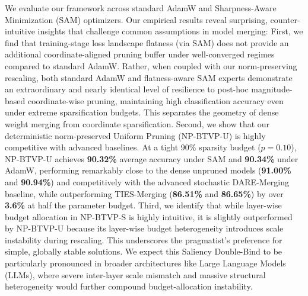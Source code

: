 We evaluate our framework across standard AdamW and Sharpness-Aware Minimization (SAM) \cite{foret2021sharpness} optimizers. Our empirical results reveal surprising, counter-intuitive insights that challenge common assumptions in model merging:
First, we find that training-stage loss landscape flatness (via SAM) does not provide an additional coordinate-aligned pruning buffer under well-converged regimes compared to standard AdamW. Rather, when coupled with our norm-preserving rescaling, both standard AdamW and flatness-aware SAM experts demonstrate an extraordinary and nearly identical level of resilience to post-hoc magnitude-based coordinate-wise pruning, maintaining high classification accuracy even under extreme sparsification budgets. This separates the geometry of dense weight merging from coordinate sparsification.
Second, we show that our deterministic norm-preserved Uniform Pruning (NP-BTVP-U) is highly competitive with advanced baselines. At a tight 90\% sparsity budget ($p=0.10$), NP-BTVP-U achieves \textbf{90.32\%} average accuracy under SAM and \textbf{90.34\%} under AdamW, performing remarkably close to the dense unpruned models (\textbf{91.00\%} and \textbf{90.94\%}) and competitively with the advanced stochastic DARE-Merging baseline, while outperforming TIES-Merging (\textbf{86.51\%} and \textbf{86.65\%}) by over \textbf{3.6\%} at half the parameter budget.
Third, we identify that while layer-wise budget allocation in NP-BTVP-S is highly intuitive, it is slightly outperformed by NP-BTVP-U because its layer-wise budget heterogeneity introduces scale instability during rescaling. This underscores the pragmatist's preference for simple, globally stable solutions. We expect this Saliency Double-Bind to be particularly pronounced in broader architectures like Large Language Models (LLMs), where severe inter-layer scale mismatch and massive structural heterogeneity would further compound budget-allocation instability.

